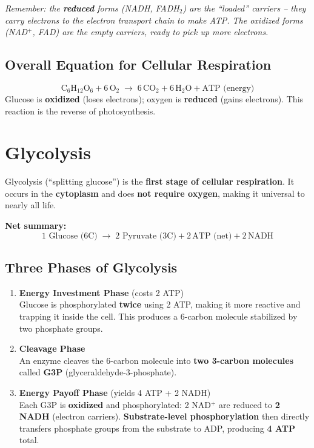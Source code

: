 \documentclass[11pt, letterpaper]{article}
\begin{document}
\vspace{4pt}
\textit{Remember: the \textbf{reduced} forms (NADH, FADH$_2$) are the ``loaded'' carriers -- they carry electrons to the electron transport chain to make ATP. The oxidized forms (NAD$^+$, FAD) are the empty carriers, ready to pick up more electrons.}

\subsection*{Overall Equation for Cellular Respiration}
\[
  \text{C}_6\text{H}_{12}\text{O}_6 + 6\,\text{O}_2 \;\longrightarrow\; 6\,\text{CO}_2 + 6\,\text{H}_2\text{O} + \text{ATP (energy)}
\]
Glucose is \textbf{oxidized} (loses electrons); oxygen is \textbf{reduced} (gains electrons). This reaction is the reverse of photosynthesis.

\section*{Glycolysis}

Glycolysis (``splitting glucose'') is the \textbf{first stage of cellular respiration}. It occurs in the \textbf{cytoplasm} and does \textbf{not require oxygen}, making it universal to nearly all life.

\textbf{Net summary:}
\[
  1 \text{ Glucose (6C)} \;\longrightarrow\; 2 \text{ Pyruvate (3C)} + 2\,\text{ATP (net)} + 2\,\text{NADH}
\]

\subsection*{Three Phases of Glycolysis}

\begin{tcolorbox}[colback=partbg, colframe=sectionblue, arc=3pt, boxrule=1pt]
\begin{enumerate}[leftmargin=*, noitemsep]
  \item \textbf{Energy Investment Phase} (costs 2 ATP)\\
    Glucose is phosphorylated \textbf{twice} using 2 ATP, making it more reactive and trapping it inside the cell. This produces a 6-carbon molecule stabilized by two phosphate groups.

  \item \textbf{Cleavage Phase}\\
    An enzyme cleaves the 6-carbon molecule into \textbf{two 3-carbon molecules} called \textbf{G3P} (glyceraldehyde-3-phosphate).

  \item \textbf{Energy Payoff Phase} (yields 4 ATP + 2 NADH)\\
    Each G3P is \textbf{oxidized} and phosphorylated: 2 NAD$^+$ are reduced to \textbf{2 NADH} (electron carriers). \textbf{Substrate-level phosphorylation} then directly transfers phosphate groups from the substrate to ADP, producing \textbf{4 ATP} total.
\end{enumerate}
\end{tcolorbox}
\end{document}

